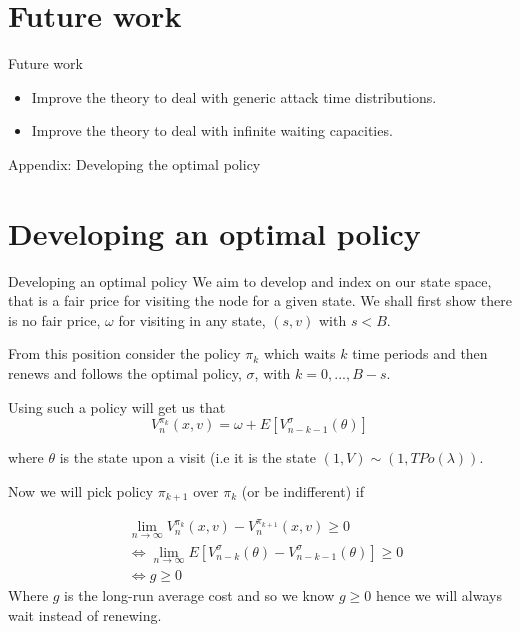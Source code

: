 \documentclass[10pt]{beamer}
\begin{document}
\section{Future work}
\begin{frame}{Future work}
\begin{itemize}
\item Improve the theory to deal with generic attack time distributions.
\item Improve the theory to deal with infinite waiting capacities.
\end{itemize}
\end{frame}

\begin{frame}

\begin{center}
\Huge Appendix: Developing the optimal policy
\end{center}

\end{frame}

\section{Developing an optimal policy}
\begin{frame}{Developing an optimal policy}
We aim to develop and index on our state space, that is a fair price for visiting the node for a given state. We shall first show there is no fair price, $\omega$ for visiting in any state, $(s,v)$ with $s < B$.

From this position consider the policy $\pi_{k}$ which waits $k$ time periods and then renews and follows the optimal policy, $\sigma$, with $k=0,...,B-s$.

Using such a policy will get us that
\begin{equation}
V_{n}^{\pi_{k}}(x,v)=\omega + E[V_{n-k-1}^{\sigma}(\theta)]
\end{equation}

where $\theta$ is the state upon a visit (i.e it is the state $(1,V) \sim (1,TPo(\lambda))$.

Now we will pick policy $\pi_{k+1}$ over $\pi_{k}$ (or be indifferent) if

\begin{align*}
&\lim\limits_{n \rightarrow \infty} V_{n}^{\pi_{k}} (x,v) - V_{n}^{\pi_{k+1}}(x,v) \geq 0 \\
& \iff \lim\limits_{n \rightarrow \infty} E[V_{n-k}^{\sigma}(\theta) - V_{n-k-1}^{\sigma} (\theta)] \geq 0 \\
& \iff g \geq 0
\end{align*}
Where $g$ is the long-run average cost and so we know $g \geq 0$ hence we will always wait instead of renewing.
\end{frame}
\end{document}
